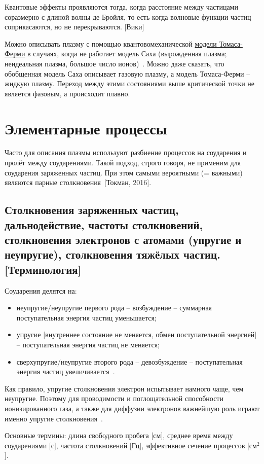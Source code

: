 \documentclass[10pt, a4paper]{article}
\numberwithin{equation}{section}
\newcommand{\Tokman}{~[Токман, 2016]}
\begin{document}
Квантовые эффекты проявляются тогда, когда расстояние между частицами соразмерно с длиной волны де Бройля, то есть когда волновые функции частиц соприкасаются, но не перекрываются. [Вики]

Можно описывать плазму с помощью квантовомеханической \uline{модели Томаса-Ферми} в случаях, когда не работает модель Саха (вырожденная плазма; неидеальная плазма, большое число ионов)~\cite{kalitkin}. Можно даже сказать, что обобщенная модель Саха описывает газовую плазму, а модель Томаса-Ферми -- жидкую плазму. Переход между этими состояниями выше критической точки не является фазовым, а происходит плавно. 

\section{Элементарные процессы}

Часто для описания плазмы используют разбиение процессов на соударения и пролёт между соударениями. Такой подход, строго говоря, не применим для соударения заряженных частиц. При этом самыми вероятными (= важными) являются парные столкновения\Tokman. 

\subsection{Столкновения заряженных частиц, дальнодействие, частоты столкновений, столкновения электронов с атомами (упругие и неупругие), столкновения тяжёлых частиц. [Терминология]}

Соударения делятся на:
\begin{itemize}
	\item неупругие/неупругие первого рода -- возбуждение -- суммарная поступательная энергия частиц уменьшается;
	\item упругие [внутреннее состояние не меняется, обмен поступательной энергией] -- поступательная энергия частиц не меняется;
	\item сверхупругие/неупругие второго рода -- девозбуждение -- поступательная энергия частиц увеличивается~\cite{raizer}.
\end{itemize}

Как правило, упругие столкновения электрон испытывает намного чаще, чем неупругие. Поэтому для проводимости и поглощательной способности ионизированного газа, а также для диффузии электронов важнейшую роль играют именно упругие столкновения~\cite{raizer}.

Основные термины: длина свободного пробега [см], среднее время между соударениями [с], частота столкновений [Гц], эффективное сечение процессов [см$^2$]. 
\end{document}
